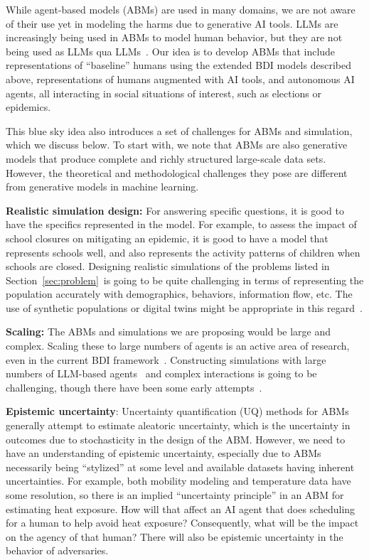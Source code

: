 While agent-based models (ABMs) are used in many domains, we are not aware of their use yet in modeling the harms due to generative AI
tools. LLMs are increasingly being used in ABMs to model human behavior, but they are not being used as LLMs qua LLMs~\citep{Gao2024llm-abm}.
Our idea is to develop ABMs that include representations of ``baseline'' humans using the extended BDI models described above, representations
of humans augmented with AI tools, and autonomous AI agents, all interacting in social situations of interest, such as elections or epidemics.

This blue sky idea also introduces a set of challenges for ABMs and simulation, which we discuss below. To start with, we note that ABMs are 
also generative models that produce complete and richly structured large-scale data sets. However, the theoretical and methodological challenges 
they pose are different from generative models in machine learning.

\smallskip
\noindent
\textbf{Realistic simulation design:} For answering specific questions, it is good to have the specifics represented in the model. For 
example, to assess the impact of school closures on mitigating an epidemic, it is good to have a model that represents schools well, and
also represents the activity patterns of children when schools are closed. Designing realistic simulations of the problems listed in
Section~\ref{sec:problem}~is going to be quite challenging in terms of representing the population accurately with demographics, behaviors,
information flow, etc. The use of synthetic populations or digital twins might be appropriate in this regard~\citep{Raghunathan2021synthetic}.

\smallskip
\noindent
\textbf{Scaling:} The ABMs and simulations we are proposing would be large and complex. Scaling these to large numbers of agents is an 
active area of research, even in the current BDI framework~\cite[e.g.,][]{deMooij2023framework}. Constructing simulations with large 
numbers of LLM-based agents~\cite[e.g.,][]{Fourney2024} and complex interactions is going to be challenging, though there have been some early attempts~\citep{Chopra2024llm}.

\smallskip
\noindent
\textbf{Epistemic uncertainty}: Uncertainty quantification (UQ) methods for ABMs generally attempt to estimate aleatoric uncertainty, which is 
the uncertainty in outcomes due to stochasticity in the design of the ABM. However, we need to have an understanding of epistemic uncertainty, 
especially due to ABMs necessarily being ``stylized'' at some level and available datasets having inherent uncertainties. For example, both 
mobility modeling and temperature data have some resolution, so there is an implied ``uncertainty principle'' in an ABM for estimating heat 
exposure. How will that affect an AI agent that does scheduling for a human to help avoid heat exposure? Consequently, what will be the
impact on the agency of that human? There will also be epistemic uncertainty in the behavior of adversaries.

